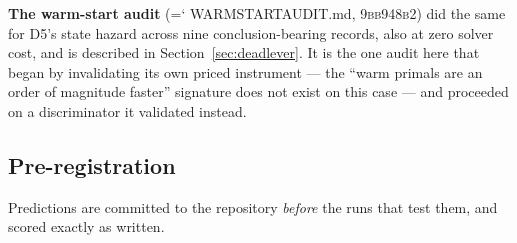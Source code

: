\documentclass[11pt,a4paper]{article}
\newcommand{\artifact}[1]{{\small\ttfamily\hyphenchar\font=`\-\relax
  \def\_{\textunderscore\allowbreak}#1}}
\newcommand{\commit}[1]{\textsc{\small #1}}
\begin{document}
\textbf{The warm-start audit} (\artifact{WARMSTART\_AUDIT.md}, \commit{9bb948b2}) did the same
for D5's state hazard across nine conclusion-bearing records, also at zero solver cost, and is
described in Section~\ref{sec:deadlever}. It is the one audit here that began by invalidating
its own priced instrument --- the ``warm primals are an order of magnitude faster'' signature
does not exist on this case --- and proceeded on a discriminator it validated instead.

\subsection{Pre-registration}

Predictions are committed to the repository \emph{before} the runs that test them, and scored
exactly as written.
\end{document}
